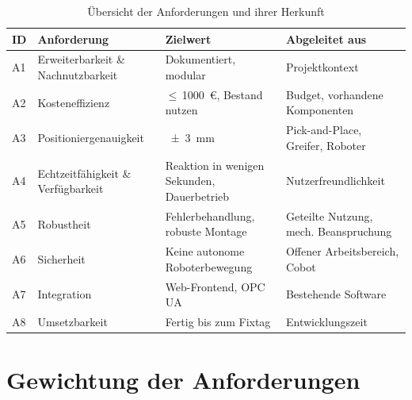 \begin{table}[H]
    \centering
    \caption{Übersicht der Anforderungen und ihrer Herkunft}
    \label{tab:anforderungen}
    \begin{tabular}{l p{4.2cm} p{3.6cm} p{4.2cm}}
        \hline
        \textbf{ID} & \textbf{Anforderung} & \textbf{Zielwert} & \textbf{Abgeleitet aus} \\
        \hline
        A1 & Erweiterbarkeit \& Nachnutzbarkeit & Dokumentiert, modular & Projektkontext \\
        A2 & Kosteneffizienz & $\leq$\,\SI{1000}{\euro}, Bestand nutzen & Budget, vorhandene Komponenten \\
        A3 & Positioniergenauigkeit & \SI{\pm 3}{\milli\metre} & Pick-and-Place, Greifer, Roboter \\
        A4 & Echtzeitfähigkeit \& Verfügbarkeit & Reaktion in wenigen Sekunden, Dauerbetrieb & Nutzerfreundlichkeit \\
        A5 & Robustheit & Fehlerbehandlung, robuste Montage & Geteilte Nutzung, mech. Beanspruchung \\
        A6 & Sicherheit & Keine autonome Roboterbewegung & Offener Arbeitsbereich, Cobot \\
        A7 & Integration & Web-Frontend, OPC UA & Bestehende Software \\
        A8 & Umsetzbarkeit & Fertig bis zum Fixtag & Entwicklungszeit \\
        \hline
    \end{tabular}
\end{table}


\section{Gewichtung der Anforderungen}
\label{sec:Gewichtung der Anforderungen}



